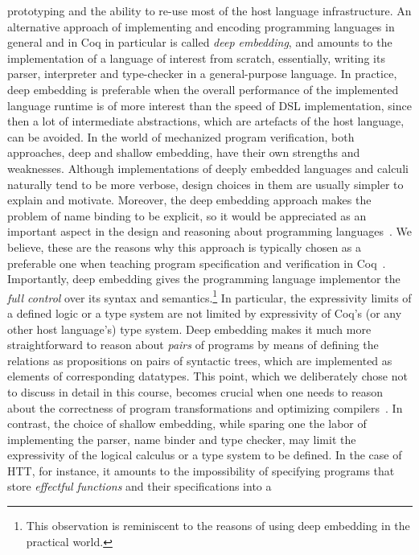 prototyping and the ability to re-use most of the host language
infrastructure.
An alternative approach of implementing and encoding programming
languages in general and in Coq in particular is called \textit{deep
embedding}, and amounts to the implementation of a language of
interest from scratch, essentially, writing its parser, interpreter
and type-checker in a general-purpose language. In practice, deep
embedding is preferable when the overall performance of the
implemented language runtime is of more interest than the speed of DSL
implementation, since then a lot of intermediate abstractions, which
are artefacts of the host language, can be avoided.
In the world of mechanized program verification, both approaches, deep
and shallow embedding, have their own strengths and weaknesses.
Although implementations of deeply embedded languages and calculi
naturally tend to be more verbose, design choices in them are usually
simpler to explain and motivate. Moreover, the deep embedding approach
makes the problem of name binding to be explicit, so it would be
appreciated as an important aspect in the design and reasoning about
programming
languages~\cite{Aydemir-al:POPL08,Weirich-al:ICFP11,Chargueraud:JAR12}. We
believe, these are the reasons why this approach is typically chosen as
a preferable one when teaching program specification and verification in
Coq~\cite{Pierce-al:SF}.
Importantly, deep embedding gives the programming language implementor
the \textit{full control} over its syntax and semantics.\footnote{This
observation is reminiscent to the reasons of using deep embedding in
the practical world.} In particular, the expressivity limits of a
defined logic or a type system are not limited by expressivity of
Coq's (or any other host language's) type system. Deep embedding makes
it much more straightforward to reason about \textit{pairs} of programs by
means of defining the relations as propositions on pairs of syntactic
trees, which are implemented as elements of corresponding datatypes.
This point, which we deliberately chose not to discuss in detail in
this course, becomes crucial when one needs to reason about the
correctness of program transformations and optimizing
compilers~\cite{Appel:BOOK14}. In contrast, the choice of shallow
embedding, while sparing one the labor of implementing the parser,
name binder and type checker, may limit the expressivity of the
logical calculus or a type system to be defined. In the case of HTT,
for instance, it amounts to the impossibility of specifying programs that
store \textit{effectful functions} and their specifications into a
